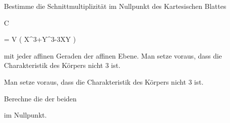 {} {}



{}

{


Bestimme die Schnittmultiplizität im Nullpunkt des Kartesischen Blattes


\mavergleichskettedisp

{\vergleichskette

{ C
}

{ =} { V \left(  X^3+Y^3-3XY  \right)
}

{ } {
}

{ } {
}

{ } {
}

}
{}{}{}
mit jeder affinen Geraden der affinen Ebene. Man setze voraus, dass die Charakteristik des Körpers nicht $3$ ist.


}

{Man setze voraus, dass die Charakteristik des Körpers nicht $3$ ist.} {}





{}

{


Berechne die
der beiden


 {  }


im Nullpunkt.


}

{} {}



{}

